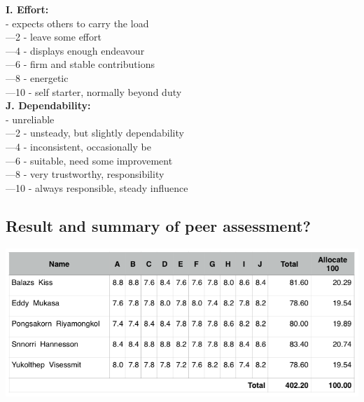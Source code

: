 \documentclass[11pt]{article}
\begin{document}
\textbf{I. Effort:}\\
	\indent{}	- expects others to carry the load\\
	\indent{}—2	- leave some effort\\
	\indent{}—4	- displays enough endeavour\\
	\indent{}—6	- firm and stable contributions\\
	\indent{}—8	- energetic\\
	\indent{}—10	- self starter, normally beyond duty\\

\textbf{J. Dependability:}\\ 
	\indent{}	- unreliable\\
	\indent{}—2	- unsteady, but slightly dependability \\
	\indent{}—4	- inconsistent, occasionally be\\
	\indent{}—6	- suitable, need some improvement \\
	\indent{}—8	- very trustworthy, responsibility \\
	\indent{}—10	- always responsible, steady influence \\

\subsection{Result and summary of peer assessment?}
\begin{center}			
\includegraphics[scale = 0.5]{Figure04}
\end{center}

\newpage	




\newpage	

\appendix

\newpage

\newpage

\end{document}
